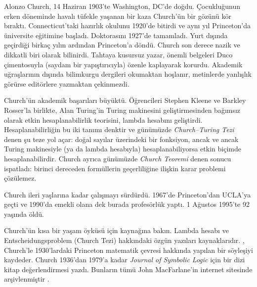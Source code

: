 




Alonzo Church, 14 Haziran 1903'te Washington, DC'de doğdu. Çocukluğunun
erken döneminde havalı tüfekle yaşanan bir kaza Church'ün bir gözünü kör
bıraktı. Connecticut'taki hazırlık okulunu 1920'de bitirdi ve aynı yıl
Princeton'da üniversite eğitimine başladı. Doktorasını 1927'de tamamladı.
Yurt dışında geçirdiği birkaç yılın ardından Princeton'a döndü. Church son
derece nazik ve dikkatli biri olarak bilinirdi. Tahtaya kusursuz yazar,
önemli belgeleri Duco çimentosuyla (saydam bir yapıştırıcıyla) özenle
kaplayarak korurdu. Akademik uğraşlarının dışında bilimkurgu dergileri
okumaktan hoşlanır, metinlerde yanlışlık görürse editörlere yazmaktan
çekinmezdi.

Church'ün akademik başarıları büyüktü. Öğrencileri Stephen Kleene ve
Barkley Rosser'la birlikte, Alan Turing'in Turing makinesini geliştirmesinden
bağımsız olarak etkin hesaplanabilirlik teorisini, lambda hesabını
geliştirdi. Hesaplanabilirliğin bu iki tanımı denktir ve günümüzde
\emph{Church--Turing Tezi} denen şu teze yol açar: doğal sayılar üzerindeki
bir fonksiyon, ancak ve ancak Turing makinesiyle (ya da lambda hesabıyla)
hesaplanabiliyorsa etkin biçimde hesaplanabilirdir. Church ayrıca günümüzde
\emph{Church Teoremi} denen sonucu ispatladı: birinci dereceden formüllerin
geçerliliğine ilişkin karar problemi çözülemez.

Church ileri yaşlarına kadar çalışmayı sürdürdü. 1967'de Princeton'dan
UCLA'ya geçti ve 1990'da emekli olana dek burada profesörlük yaptı. 1
Ağustos 1995'te 92 yaşında öldü.

\begin{reading}
Church'ün kısa bir yaşam öyküsü için \citet{EndertonND} kaynağına bakın.
Lambda hesabı ve Entscheidungsproblem (Church Tezi) hakkındaki özgün
yazıları \citet{Church1936,Church1936a} kaynaklarıdır.
\citet{Aspray1984}, Church'le 1930'lardaki Princeton matematik çevresi
hakkında yapılan bir söyleşiyi kaydeder. Church 1936'dan 1979'a kadar
\emph{Journal of Symbolic Logic} için bir dizi kitap değerlendirmesi yazdı.
Bunların tümü John MacFarlane'in internet sitesinde arşivlenmiştir
\citep{MacFarlane2015}.
\end{reading}
